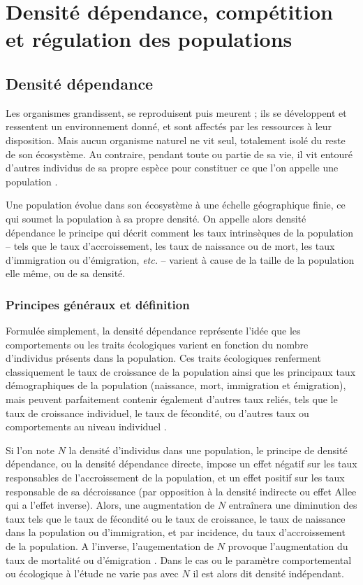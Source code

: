 \section{Densité dépendance, compétition et régulation des populations}

\subsection{Densité dépendance}

Les organismes grandissent, se reproduisent puis meurent ; ils se développent et
ressentent un environnement donné, et sont affectés par les ressources à leur
disposition. Mais aucun organisme naturel ne vit seul, totalement isolé du reste
de son écosystème. Au contraire, pendant toute ou partie de sa vie, il vit
entouré d'autres individus de sa propre espèce pour constituer ce que l'on
appelle une population \autocite{begon2009a}. 

Une population évolue dans son écosystème à une échelle géographique finie, ce
qui soumet la population à sa propre densité. On appelle alors densité
dépendance le principe qui décrit comment les taux intrinsèques de la
population -- tels que le taux d'accroissement, les taux de naissance ou de
mort, les taux d'immigration ou d'émigration, \textit{etc.} -- varient à cause
de la taille de la population elle même, ou de sa densité.

\subsubsection{Principes généraux et définition}

Formulée simplement, la densité dépendance représente l'idée que les
comportements ou les traits écologiques varient en fonction du nombre
d'individus présents dans la population. Ces traits écologiques renferment
classiquement le taux de croissance de la population ainsi que les principaux
taux démographiques de la population (naissance, mort, immigration et
émigration), mais peuvent parfaitement contenir également d'autres taux reliés,
tels que le taux de croissance individuel, le taux de fécondité, ou d'autres
taux ou comportements au niveau individuel \autocite{royama1977a}. 

Si l'on note $N$ la densité d'individus dans une population, le principe de
densité dépendance, ou la densité dépendance directe, impose un effet négatif
sur les taux responsables de l'accroissement de la population, et un effet
positif sur les taux responsable de sa décroissance (par opposition à la
densité indirecte ou effet Allee qui a l'effet inverse). Alors, une augmentation
de $N$ entraînera une diminution des taux tels que le taux de fécondité ou le
taux de croissance, le taux de naissance dans la population ou d'immigration, et
par incidence, du taux d'accroissement de la population. A l'inverse,
l'augementation de $N$ provoque l'augmentation du taux de mortalité ou
d'émigration \autocite{hixon2009a}. Dans le cas ou le paramètre comportemental
ou écologique à l'étude ne varie pas avec $N$ il est alors dit densité
indépendant. 


